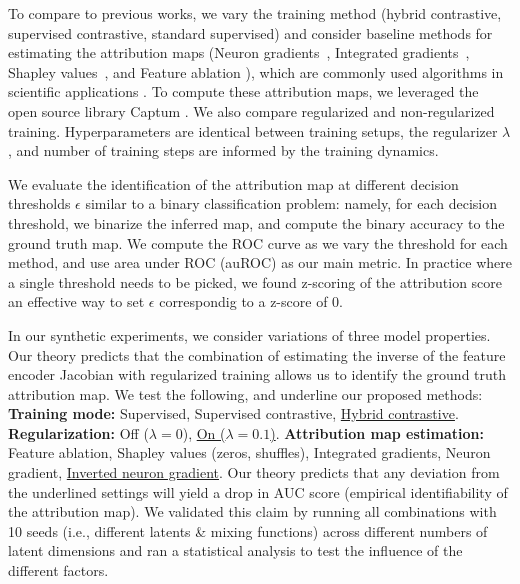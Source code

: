         To compare to previous works, we vary the training method (hybrid contrastive, supervised contrastive, standard supervised) and consider baseline methods for estimating the attribution maps (Neuron gradients~\citep{Simonyan2013DeepIC}, Integrated gradients~\citep{shrikumar2018computationally,Sundararajan2017AxiomaticAF}, Shapley values~\citep{shapley1953value,lundberg2017unified}, and Feature ablation \citep{molnar2022}), which are commonly used algorithms in scientific applications \citep{samek2019explainable,molnar2022}. To compute these attribution maps, we leveraged the open source library Captum \citep{kokhlikyan2020captum}. We also compare regularized and non-regularized training. Hyperparameters are identical between training setups, the regularizer $\lambda$, and number of training steps are informed by the training dynamics.

        We evaluate the identification of the attribution map at different decision thresholds $\epsilon$ similar to a binary classification problem: namely, for each decision threshold, we binarize the inferred map, and compute the binary accuracy to the ground truth map. We compute the ROC curve as we vary the threshold for each method, and use area under ROC (auROC) as our main metric. In practice where a single threshold needs to be picked, we found z-scoring of the attribution score an effective way to set $\epsilon$ correspondig to a z-score of 0.

        In our synthetic experiments, we consider variations of three model properties. Our theory predicts that the combination of estimating the inverse of the feature encoder Jacobian with regularized training allows us to identify the ground truth attribution map. We test the following, and underline our proposed methods: \textbf{Training mode:} Supervised, Supervised contrastive, \underline{Hybrid contrastive}.
        \textbf{Regularization:}  Off ($\lambda = 0$), \underline{On ($\lambda = 0.1$)}.
        \textbf{Attribution map estimation:} Feature ablation, Shapley values (zeros, shuffles), Integrated gradients, Neuron gradient, \underline{Inverted neuron gradient}.
        Our theory predicts that any deviation from the underlined settings will yield a drop in AUC score (empirical identifiability of the attribution map).
        We validated this claim by running all combinations with 10 seeds (i.e., different latents \& mixing functions) across different numbers of latent dimensions and ran a statistical analysis to test the influence of the different factors.

